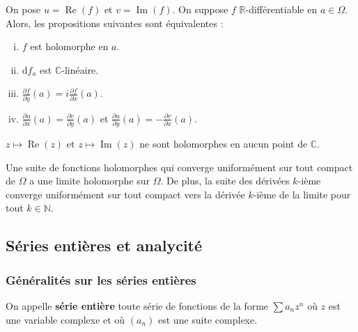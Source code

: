 
	\begin{theorem}
		On pose $u = \operatorname{Re}(f)$ et $v = \operatorname{Im}(f)$. On suppose $f$ $\mathbb{R}$-différentiable en $a \in \Omega$. Alors, les propositions suivantes sont équivalentes :
		\begin{enumerate}[(i)]
			\item $f$ est holomorphe en $a$.
			\item $\mathrm{d}f_a$ est $\mathbb{C}$-linéaire.
			\item $\frac{\partial f}{\partial y} (a) = i \frac{\partial f}{\partial x} (a)$.
			\item $\frac{\partial u}{\partial x} (a) = \frac{\partial v}{\partial y} (a)$ et $\frac{\partial u}{\partial y} (a) = -\frac{\partial v}{\partial x} (a)$.
		\end{enumerate}
	\end{theorem}


	\begin{example}
		$z \mapsto \operatorname{Re}(z)$ et $z \mapsto \operatorname{Im}(z)$ ne sont holomorphes en aucun point de $\mathbb{C}$.
	\end{example}


	\begin{theorem}[Weierstrass]
		Une suite de fonctions holomorphes qui converge uniformément sur tout compact de $\Omega$ a une limite holomorphe sur $\Omega$. De plus, la suite des dérivées $k$-ième converge uniformément sur tout compact vers la dérivée $k$-ième de la limite pour tout $k \in \mathbb{N}$.
	\end{theorem}

	\subsection{Séries entières et analycité}

	\subsubsection{Généralités sur les séries entières}


	\begin{definition}
		On appelle \textbf{série entière} toute série de fonctions de la forme $\sum a_n z^n$ où $z$ est une variable complexe et où $(a_n)$ est une suite complexe.
	\end{definition}

